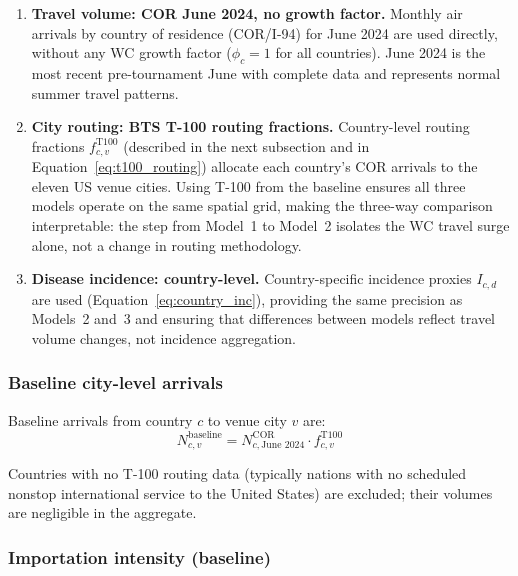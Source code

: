 \documentclass[12pt]{article}
\begin{document}
\begin{enumerate}
  \item \textbf{Travel volume: COR June 2024, no growth factor.}
    Monthly air arrivals by country of residence (COR/I-94) for
    June 2024 are used directly, without any WC growth factor
    ($\phi_c = 1$ for all countries). June 2024 is the most recent
    pre-tournament June with complete data and represents normal
    summer travel patterns.

  \item \textbf{City routing: BTS T-100 routing fractions.}
    Country-level routing fractions $f_{c,v}^{\text{T100}}$
    (described in the next subsection and in
    Equation~\ref{eq:t100_routing}) allocate each country's COR
    arrivals to the eleven US venue cities. Using T-100 from the
    baseline ensures all three models operate on the same spatial
    grid, making the three-way comparison interpretable: the step
    from Model~1 to Model~2 isolates the WC travel surge alone,
    not a change in routing methodology.

  \item \textbf{Disease incidence: country-level.}
    Country-specific incidence proxies $I_{c,d}$ are used
    (Equation~\ref{eq:country_inc}), providing the same precision
    as Models~2 and~3 and ensuring that differences between models
    reflect travel volume changes, not incidence aggregation.
\end{enumerate}

\subsubsection*{Baseline city-level arrivals}

Baseline arrivals from country $c$ to venue city $v$ are:
\begin{equation}
  N_{c,v}^{\text{baseline}} = N_{c,\text{June 2024}}^{\text{COR}}
    \cdot f_{c,v}^{\text{T100}}
  \label{eq:baseline_arrivals}
\end{equation}

Countries with no T-100 routing data (typically nations with no
scheduled nonstop international service to the United States) are
excluded; their volumes are negligible in the aggregate.

\subsubsection*{Importation intensity (baseline)}
\end{document}
